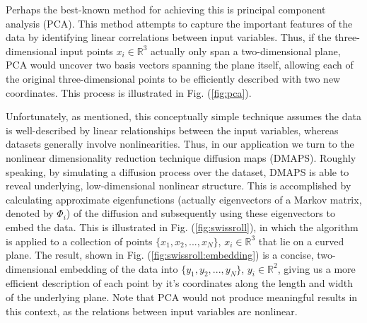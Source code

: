 \documentclass[11pt]{article}
\begin{document}
Perhaps the best-known method for achieving this is principal component analysis (PCA). This method attempts to capture the important features of the data by identifying linear correlations between input variables. Thus, if the three-dimensional input points $x_i \in \mathbb{R}^3$ actually only span a two-dimensional plane, PCA would uncover two basis vectors spanning the plane itself, allowing each of the original three-dimensional points to be efficiently described with two new coordinates. This process is illustrated in Fig. (\ref{fig:pca}).

Unfortunately, as mentioned, this conceptually simple technique assumes the data is well-described by linear relationships between the input variables, whereas datasets generally involve nonlinearities. Thus, in our application we turn to the nonlinear dimensionality reduction technique diffusion maps (DMAPS). Roughly speaking, by simulating a diffusion process over the dataset, DMAPS is able to reveal underlying, low-dimensional nonlinear structure. This is accomplished by calculating approximate eigenfunctions (actually eigenvectors of a Markov matrix, denoted by $\Phi_i$) of the diffusion and subsequently using these eigenvectors to embed the data. This is illustrated in Fig. (\ref{fig:swissroll}), in which the algorithm is applied to a collection of points $\{x_1, x_2, ..., x_N\}$, $x_i \in \mathbb{R}^3$ that lie on a curved plane. The result, shown in Fig. (\ref{fig:swissroll:embedding}) is a concise, two-dimensional embedding of the data into $\{y_1, y_2, ..., y_N\}$, $y_i \in \mathbb{R}^2$, giving us a more efficient description of each point by it's coordinates along the length and width of the underlying plane. Note that PCA would not produce meaningful results in this context, as the relations between input variables are nonlinear.


\end{document}
